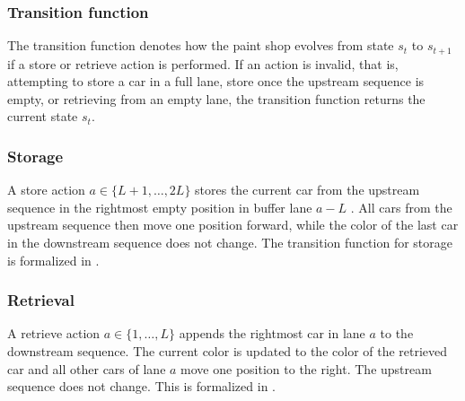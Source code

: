 \documentclass[11pt]{elsarticle}
\begin{document}
\subsubsection*{Transition function}

The transition function denotes how the paint shop evolves from state $s_t$ to $s_{t+1}$ if a store or retrieve action is performed. If an action is invalid, that is, attempting to store a car in a full lane, store once the upstream sequence is empty, or retrieving from an empty lane, the transition function returns the current state $s_t$.

\subsubsection*{Storage}

A store action $a\in \{L+1,\dots, 2L\}$ stores the current car from the upstream sequence in the rightmost empty position in buffer lane $a-L$ . All cars from the upstream sequence then move one position forward, while the color of the last car in the downstream sequence does not change. The transition function for storage is formalized in .


\subsubsection*{Retrieval}

A retrieve action $a\in \{1,\dots, L\}$ appends the rightmost car in lane $a$ to the downstream sequence. The current color is updated to the color of the retrieved car and all other cars of lane $a$ move one position to the right. The upstream sequence does not change. This is formalized in .
\end{document}
